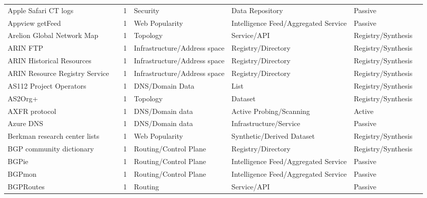 \documentclass[11pt,a4paper]{article}
\begin{document}
\begin{longtable}{@{}p{}p{}p{}p{}p{}p{}p{}@{}}
Apple Safari CT logs & \cite{apple_safari_ct} & 1 & Security & Data Repository & Passive & \cite{10.1145/3618257.3624802} \\
Appview getFeed & \cite{appview_getfeed} & 1 & Web Popularity & Intelligence Feed/Aggregated Service & Passive & \cite{10.1145/3646547.3688407} \\
Arelion Global Network Map & \cite{arelion} & 1 & Topology & Service/API & Registry/Synthesis & \cite{10.1145/3777912.3809135} \\
ARIN FTP & \cite{arin_ftp} & 1 & Infrastructure/Address space & Registry/Directory & Registry/Synthesis & \cite{10.1145/3487552.3487838} \\
ARIN Historical Resources & \cite{arin_erx} & 1 & Infrastructure/Address space & Registry/Directory & Registry/Synthesis & \cite{10.1145/3487552.3487838} \\
ARIN Resource Registry Service & \cite{arin_rrs} & 1 & Infrastructure/Address space & Registry/Directory & Registry/Synthesis & \cite{10.1145/3730567.3764452} \\
AS112 Project Operators & \cite{as112} & 1 & DNS/Domain Data & List & Registry/Synthesis & \cite{10.1007/978-3-032-18268-5_9} \\
AS2Org+ & \cite{10.1007/978-3-031-28486-1_17} & 1 & Topology & Dataset & Registry/Synthesis & \cite{10.1145/3777912.3809155} \\
AXFR protocol & \cite{axfr_protocol} & 1 & DNS/Domain data & Active Probing/Scanning & Active & \cite{10.1145/3730567.3764501} \\
Azure DNS & \cite{azure_dns} & 1 & DNS/Domain data & Infrastructure/Service & Passive & \cite{10.1007/978-3-030-72582-2_14} \\
Berkman research center lists & \cite{berkman_lists} & 1 & Web Popularity & Synthetic/Derived Dataset & Registry/Synthesis & \cite{10.1145/3618257.3624817} \\
BGP community dictionary & \cite{bgp_community_dict} & 1 & Routing/Control Plane & Registry/Directory & Registry/Synthesis & \cite{10.1145/3730567.3732924} \\
BGPie & \cite{bgpie} & 1 & Routing/Control Plane & Intelligence Feed/Aggregated Service & Passive & \cite{10.1007/978-3-030-72582-2_13} \\
BGPmon & \cite{bgpmon} & 1 & Routing/Control Plane & Intelligence Feed/Aggregated Service & Passive & \cite{10.1145/3487552.3487838} \\
BGPRoutes & \cite{bgproutes} & 1 & Routing & Service/API & Passive & \cite{10.1145/3777912.3839829} \\

\end{longtable}
\end{document}
